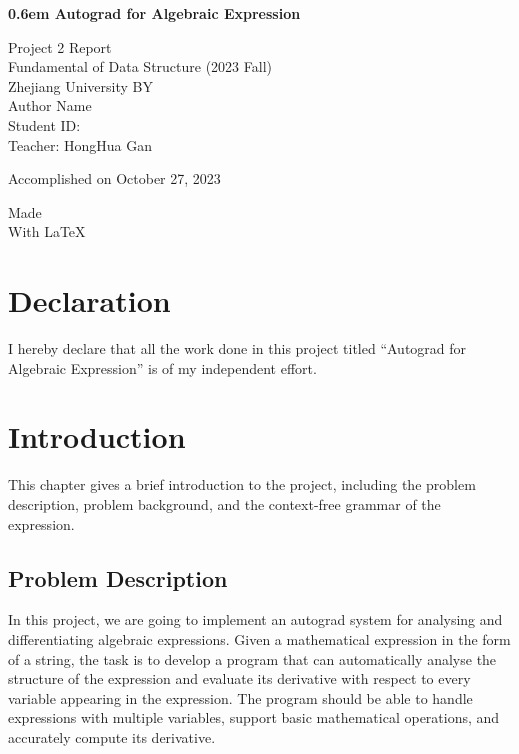 \documentclass[a4paper,oneside]{book}
\begin{document}
\clearpage
\newcommand\nbvspace[1][3]{\vspace*{\stretch{#1}}}
\newcommand\nbstretchyspace{\spaceskip0.5em plus 0.25em minus 0.25em}
\newcommand{\nbtitlestretch}{\spaceskip0.6em}
\pagestyle{empty}
\begin{center}
    \bfseries
    \nbvspace[1]
    \Huge
    {\nbtitlestretch\huge
        Autograd for Algebraic Expression}

    \nbvspace[1]
    \normalsize

    Project 2 Report\\
    Fundamental of Data Structure (2023 Fall)\\
    Zhejiang University
    \nbvspace[1]
    \small BY\\
    \Large Author Name\\[0.5em]
    \footnotesize Student ID: \\
    Teacher: HongHua Gan

    \nbvspace[2]
    Accomplished on October 27, 2023
    \nbvspace[3]
    \normalsize

    Made\\
    \large
    With \LaTeX
    \nbvspace[1]
\end{center}

\chapter*{Declaration}

I hereby declare that all the work done in this project titled ``Autograd for Algebraic Expression'' is of my independent effort.

\tableofcontents

\chapter{Introduction}

This chapter gives a brief introduction to the project, including the problem
description, problem background, and the context-free grammar of the expression.

\section{Problem Description}

In this project, we are going to implement an autograd system for analysing and differentiating algebraic expressions. Given a mathematical expression in the form of a string, the task is to develop a program that can automatically analyse the structure of the expression and evaluate its derivative with respect to every variable appearing in the expression. The program should be able to handle expressions with multiple variables, support basic mathematical operations, and accurately compute its derivative.
\end{document}
